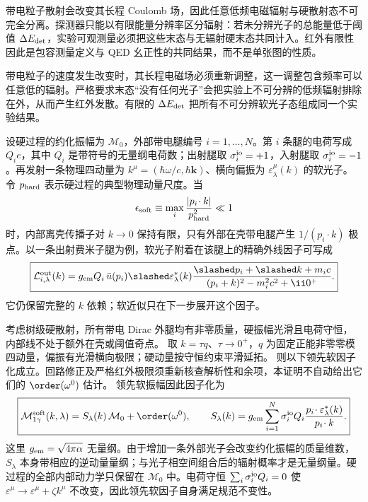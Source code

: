 带电粒子散射会改变其长程 Coulomb 场，因此任意低频电磁辐射与硬散射态不可完全分离。探测器只能以有限能量分辨率区分辐射：若未分辨光子的总能量低于阈值 $\Delta E_{\rm det}$，实验可观测量必须把这些末态与无辐射硬末态共同计入。红外有限性因此是包容测量定义与 QED 幺正性的共同结果，而不是单张图的性质。

带电粒子的速度发生改变时，其长程电磁场必须重新调整，这一调整包含频率可以任意低的辐射。严格要求末态“没有任何光子”会把实验上不可分辨的低频辐射排除在外，从而产生红外发散。有限的 $\Delta E_{\rm det}$ 把所有不可分辨软光子态组成同一个实验结果。


设硬过程的约化振幅为 $\mathcal M_0$，外部带电腿编号 $i=1,\ldots,N$。第 $i$ 条腿的电荷写成 $Q_i e$，其中 $Q_i$ 是带符号的无量纲电荷数；出射腿取 $\sigma_i^{\rm io}=+1$，入射腿取 $\sigma_i^{\rm io}=-1$。再发射一条物理四动量为
$k^\mu=(\hbar\omega/c,\hbar\mathbf k)$、横向偏振为 $\varepsilon_\lambda^\mu(k)$ 的软光子。令 $p_{\rm hard}$ 表示硬过程的典型物理动量尺度。当
\[
 \epsilon_{\rm soft}\equiv
 \max_i\frac{|p_i\!\cdot k|}{p_{\rm hard}^2}\ll1
\]
时，内部离壳传播子对 $k\to0$ 保持有限，只有外部在壳带电腿产生 $1/(p_i\!\cdot k)$ 极点。以一条出射费米子腿为例，软光子附着在该腿上的精确外线因子可写成
\begin{equation}
 \boxed{
 \mathcal L_{i,\lambda}^{\rm out}(k)
 =g_{\rm em}Q_i\,
 \bar u(p_i)\slashed\varepsilon_\lambda^*(k)
 \frac{\slashed p_i+\slashed k+m_ic}
 {(p_i+k)^2-m_i^2c^2+\ii0^+}.}
 \label{eq:soft-external-leg-kernel-dp68}
\end{equation}
它仍保留完整的 $k$ 依赖；软近似只在下一步展开这个因子。\begin{theorem}
考虑树级硬散射，所有带电 Dirac 外腿均有非零质量，硬振幅光滑且电荷守恒，内部线不处于额外在壳或阈值奇点。
取 $k=\tau q$、$\tau\to0^+$，$q$ 为固定正能非零零模四动量，偏振有光滑横向极限；硬动量按守恒约束平滑延拓。
则以下领先软因子化成立。回路修正及严格红外极限须重新核查解析性和余项，本证明不自动给出它们的 $\order(\omega^0)$ 估计。
领先软振幅因此因子化为
\begin{equation}
 \boxed{
 \mathcal M_{1\gamma}^{\rm soft}(k,\lambda)
 =S_\lambda(k)\,\mathcal M_0+\order(\omega^0),
 \qquad
 S_\lambda(k)
 =g_{\rm em}\sum_{i=1}^{N}
 \sigma_i^{\rm io}Q_i
 \frac{p_i\!\cdot\varepsilon_\lambda^*(k)}{p_i\!\cdot k}.}
 \label{eq:weinberg-soft-photon-factor-dp10}
\end{equation}
这里 $g_{\rm em}=\sqrt{4\pi\alpha}$ 无量纲。由于增加一条外部光子会改变约化振幅的质量维数，$S_\lambda$ 本身带相应的逆动量量纲；与光子相空间组合后的辐射概率才是无量纲量。硬过程的全部内部动力学只保留在 $\mathcal M_0$ 中。电荷守恒
$\sum_i\sigma_i^{\rm io}Q_i=0$ 使 $\varepsilon^\mu\to\varepsilon^\mu+\zeta k^\mu$ 不改变，因此领先软因子自身满足规范不变性。
\end{theorem}

